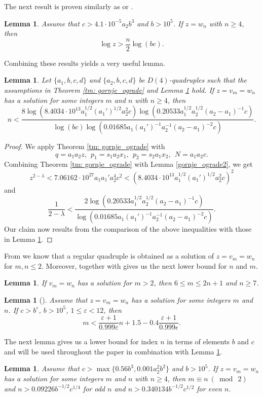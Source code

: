 \documentclass[12pt]{amsart}%
\newtheorem{lemma}[theorem]{Lemma}
\theoremstyle{definition}
\theoremstyle{remark}
\theoremstyle{plain}
\begin{document}
The next result is proven similarly as \cite[Lemma 6]{nas2} or \cite[Lemma 8]{sestorka}.
\begin{lemma}\label{gornje_ograde3}
     Assume that $c >4.1\cdot10^{-5}a_2b^3$ and $b>10^5$. If $z=w_n$ with $n \geq 4$, then 
    \[ \log z > \frac{n}{2}\log(bc) .\]
\end{lemma}  
Combining these results yields a very useful lemma.
\begin{lemma}\label{lemma: gornja_n_1}
    Let $\{a_1,b,c,d\}$ and $\{a_2,b,c,d\}$ be $D(4)$-quadruples such that the assumptions in Theorem \ref{tm: gornje_ograde} and Lemma \ref{gornje_ograde3} hold. If $z=v_m=w_n$ has a solution for some integers $m$ and $n$ with $n \geq 4$, then 
   $$ n < \frac{8\log(8.4034 \cdot 10^{13} a_1^{1/2}(a_1')^{1/2}a_2^2c)\log(0.20533a_1^{1/2}a_2^{1/2}(a_2-a_1)^{-1}c)}{\log(bc)\log(0.01685a_1(a_1')^{-1}a_2^{-1}(a_2-a_1)^{-2}c)}. $$
\end{lemma}
\begin{proof}
    We apply Theorem \ref{tm: gornje_ograde} with
    \[q=a_1a_2z,\:\: p_1=s_1a_2x_1,\:\: p_2=s_2a_1x_2,\:\: N=a_1a_2c.\]
    Combining Theorem \ref{tm: gornje_ograde} with Lemma \ref{gornje_ograde2}, we get
    \[ z^{2-\lambda} < 7.06162 \cdot 10^{27} a_1a_1'a_2^4c^2 < (8.4034 \cdot 10^{13} a_1^{1/2}(a_1')^{1/2}a_2^2c)^2  \]
    and
    $$\frac{1}{2-\lambda} < \frac{2\log(0.20533a_1^{1/2}a_2^{1/2}(a_2-a_1)^{-1}c)}{\log(0.01685a_1(a_1')^{-1}a_2^{-1}(a_2-a_1)^{-2}c)}.$$
    Our claim now results from the comparison of the above inequalities with those in Lemma \ref{gornje_ograde3}.
\end{proof}


From \cite[Lemma 2.6]{mbt} we know that a regular quadruple is obtained as a solution of $z=v_m=w_n$ for $m,n\leq 2$. Moreover, \cite[Lemma 2.10]{mbt} together with \cite[Theorem 1.3]{mbt} gives us the next lower bound for $n$ and $m$.
\begin{lemma}\label{lema: n vece 7}
If $v_m=w_n$ has a solution for $m>2$, then $6\leq m \leq  2n + 1$ and $n \geq 7$.
\end{lemma}

\begin{lemma}[{\cite[Lemma 2.9]{mbt}}]\label{lemma: epsilon}
    Assume that $z=v_m=w_n$ has a solution for some integers $m$ and $n$. If $c>b^{\varepsilon}$, $b>10^5$, $1 \leq \varepsilon < 12$, then 
    $$ m < \frac{\varepsilon+1}{0.999\varepsilon}n + 1.5 - 0.4\frac{\varepsilon+1}{0.999\epsilon}.$$
\end{lemma}
The next lemma gives us a lower bound for index $n$ in terms of elements $b$ and $c$ and will be used throughout the paper in combination with Lemma \ref{lemma: gornja_n_1}. 
\begin{lemma}\label{lema: donja na n u terminima b i c}
    Assume that $c>\max\{0.56b^3,0.001a_2^2b^2\}$ and $b>10^5$. If $z=v_m=w_n$ has a solution for some integers $m$ and $n$ with $n\geq 4$, then $m\equiv n\ (\bmod \ 2)$ and $n>0.09226b^{-1/2}c^{1/4}$ for odd $n$ and $n>0.340134b^{-1/2}c^{1/2}$ for even $n$.
\end{lemma}
\end{document}

